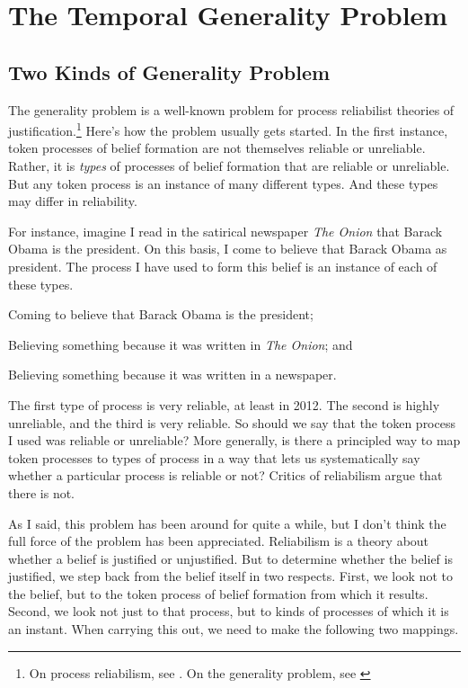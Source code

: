\documentclass[11pt,oneside]{book}
\begin{document}
\chapter{The Temporal Generality Problem}

\section{Two Kinds of Generality Problem}

The generality problem is a well-known problem for process reliabilist theories of justification.\footnote{On process reliabilism, see \cite{Goldman1979}. On the generality problem, see \cite{Feldman1985, ConeeFeldman1998}} Here's how the problem usually gets started. In the first instance, token processes of belief formation are not themselves reliable or unreliable. Rather, it is \textit{types} of processes of belief formation that are reliable or unreliable. But any token process is an instance of many different types. And these types may differ in reliability. 

For instance, imagine I read in the satirical newspaper \textit{The Onion} that Barack Obama is the president. On this basis, I come to believe that Barack Obama as president. The process I have used to form this belief is an instance of each of these types.

\begin{enumerate*}
\item Coming to believe that Barack Obama is the president;
\item Believing something because it was written in \textit{The Onion}; and
\item Believing something because it was written in a newspaper.
\end{enumerate*}

\noindent The first type of process is very reliable, at least in 2012. The second is highly unreliable, and the third is very reliable. So should we say that the token process I used was reliable or unreliable? More generally, is there a principled way to map token processes to types of process in a way that lets us systematically say whether a particular process is reliable or not? Critics of reliabilism argue that there is not.

As I said, this problem has been around for quite a while, but I don't think the full force of the problem has been appreciated. Reliabilism is a theory about whether a belief is justified or unjustified. But to determine whether the belief is justified, we step back from the belief itself in two respects. First, we look not to the belief, but to the token process of belief formation from which it results. Second, we look not just to that process, but to kinds of processes of which it is an instant. When carrying this out, we need to make the following two mappings.
\end{document}
